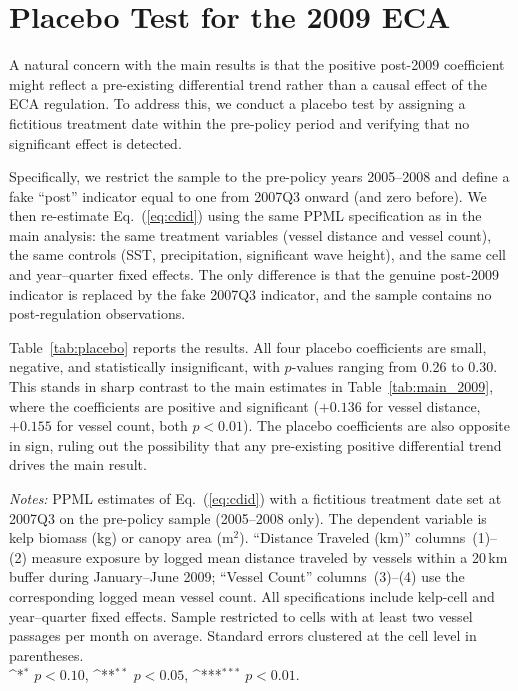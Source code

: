 \documentclass[12pt]{article}
\providecommand{\sym}[1]{\ifmmode^{#1}\else\(^{#1}\)\fi}
\begin{document}
\newpage

\section{Placebo Test for the 2009 ECA}\label{appendix_placebo}

A natural concern with the main results is that the positive post-2009 coefficient might reflect a pre-existing differential trend rather than a causal effect of the ECA regulation. To address this, we conduct a placebo test by assigning a fictitious treatment date within the pre-policy period and verifying that no significant effect is detected.

Specifically, we restrict the sample to the pre-policy years 2005--2008 and define a fake ``post'' indicator equal to one from 2007Q3 onward (and zero before). We then re-estimate Eq.~(\ref{eq:cdid}) using the same PPML specification as in the main analysis: the same treatment variables (vessel distance and vessel count), the same controls (SST, precipitation, significant wave height), and the same cell and year--quarter fixed effects. The only difference is that the genuine post-2009 indicator is replaced by the fake 2007Q3 indicator, and the sample contains no post-regulation observations.

Table~\ref{tab:placebo} reports the results. All four placebo coefficients are small, negative, and statistically insignificant, with $p$-values ranging from 0.26 to 0.30. This stands in sharp contrast to the main estimates in Table~\ref{tab:main_2009}, where the coefficients are positive and significant ($+0.136$ for vessel distance, $+0.155$ for vessel count, both $p<0.01$). The placebo coefficients are also opposite in sign, ruling out the possibility that any pre-existing positive differential trend drives the main result.

\begin{table}[H]
  \centering
  \caption{Placebo test: Fake treatment date (2007Q3) on pre-policy sample}
  \label{tab:placebo}
  

  \vspace{0.5em}
  \begin{minipage}{\linewidth}
  \footnotesize
  \textit{Notes:} PPML estimates of Eq.~(\ref{eq:cdid}) with a fictitious treatment date set at 2007Q3 on the pre-policy sample (2005--2008 only). The dependent variable is kelp biomass (kg) or canopy area (m$^{2}$). ``Distance Traveled (km)'' columns~(1)--(2) measure exposure by logged mean distance traveled by vessels within a 20\,km buffer during January--June 2009; ``Vessel Count'' columns~(3)--(4) use the corresponding logged mean vessel count. All specifications include kelp-cell and year--quarter fixed effects. Sample restricted to cells with at least two vessel passages per month on average. Standard errors clustered at the cell level in parentheses.\\
  \sym{*} \(p<0.10\), \sym{**} \(p<0.05\), \sym{***} \(p<0.01\).
  \end{minipage}
\end{table}
\end{document}
